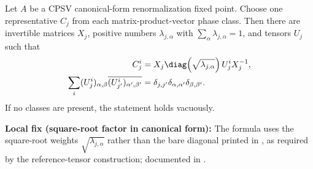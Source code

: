 \begin{lemma}%
    \label{thm:cpsv_phase_class_residual_isometries}
    \leanok
    Let $A$ be a CPSV canonical-form renormalization fixed point. Choose one
    representative $C_j$ from each matrix-product-vector phase class.
    Then there are invertible matrices $X_j$, positive numbers
    $\lambda_{j,\alpha}$ with $\sum_\alpha\lambda_{j,\alpha}=1$, and tensors
    $U_j$ such that
    \begin{align}
        C_j^i
         & =X_j\diag\!\left(\sqrt{\lambda_{j,\alpha}}\right)
        U_j^iX_j^{-1},
        \notag                                                         \\
        \sum_i(U_j^i)_{\alpha,\beta}
        \overline{(U_{j'}^i)_{\alpha',\beta'}}
         & =\delta_{j,j'}\delta_{\alpha,\alpha'}\delta_{\beta,\beta'}.
        \notag
    \end{align}
    If no classes are present, the statement holds vacuously.

    \textbf{Local fix (square-root factor in canonical form):}
    The formula uses the square-root weights $\sqrt{\lambda_{j,\alpha}}$ rather
    than the bare diagonal printed in \cite[line~547]{Cirac2016MPDO_arXiv}, as
    required by the reference-tensor construction; documented in
    \cite{gap:cpsv16_rfp_isometry_scope}.
\end{lemma}
